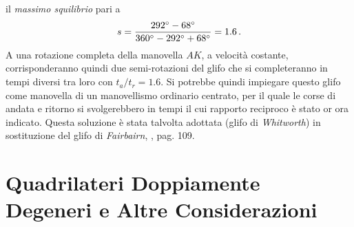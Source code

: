 il {\em massimo squilibrio} pari a
\begin{equation}
s={{292^{\circ}-68^{\circ}}\over{360^{\circ} -292^{\circ} +68^{\circ}}} = 1.6\,.
\label{eq:esempio_squilibrio_glifo}
\end{equation} 
\noindent A una rotazione completa della manovella $AK$, a velocit\`a costante,
corrisponderanno quindi due semi-rotazioni del glifo che si completeranno
in tempi diversi tra loro con $t_a/t_r=1.6$. Si potrebbe quindi impiegare questo
glifo come manovella di
un manovellismo ordinario centrato, per il quale le corse di andata e ritorno
si svolgerebbero in tempi il cui rapporto reciproco \`e stato or ora indicato. 
Questa soluzione \`e stata talvolta adottata (glifo di {\em Whitworth}) in sostituzione
del glifo di {\em Fairbairn}, \cite{sesini1}, pag. 109.

\section{Quadrilateri Doppiamente Degeneri e Altre Considerazioni}

